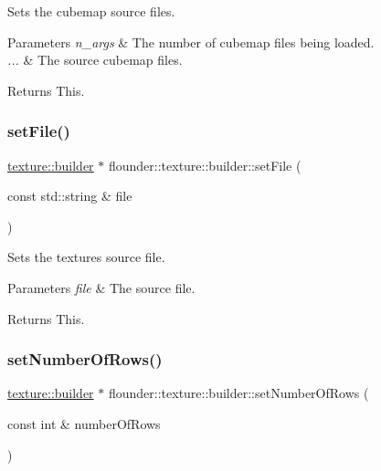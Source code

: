 Sets the cubemap source files. 


\begin{DoxyParams}{Parameters}
{\em n\+\_\+args} & The number of cubemap files being loaded. \\
\hline
{\em ...} & The source cubemap files. \\
\hline
\end{DoxyParams}
\begin{DoxyReturn}{Returns}
This. 
\end{DoxyReturn}
\mbox{\label{classflounder_1_1texture_1_1builder_a297b1c5ebff43f1764120e18e3d77d7b}} 
\subsubsection{\texorpdfstring{set\+File()}{setFile()}}
{\footnotesize\ttfamily \hyperlink{classflounder_1_1texture_1_1builder}{texture\+::builder} $\ast$ flounder\+::texture\+::builder\+::set\+File (\begin{DoxyParamCaption}\item[{const std\+::string \&}]{file }\end{DoxyParamCaption})}



Sets the textures source file. 


\begin{DoxyParams}{Parameters}
{\em file} & The source file. \\
\hline
\end{DoxyParams}
\begin{DoxyReturn}{Returns}
This. 
\end{DoxyReturn}
\mbox{\label{classflounder_1_1texture_1_1builder_ac301872d40557b9b893852578aaffbfd}} 
\subsubsection{\texorpdfstring{set\+Number\+Of\+Rows()}{setNumberOfRows()}}
{\footnotesize\ttfamily \hyperlink{classflounder_1_1texture_1_1builder}{texture\+::builder} $\ast$ flounder\+::texture\+::builder\+::set\+Number\+Of\+Rows (\begin{DoxyParamCaption}\item[{const int \&}]{number\+Of\+Rows }\end{DoxyParamCaption})}



